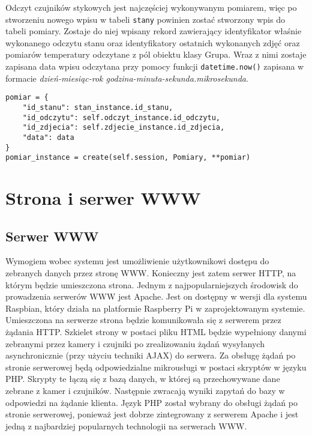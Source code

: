 \documentclass[a4paper,11pt,twoside]{article}
\begin{document}
Odczyt czujników stykowych jest najczęściej wykonywanym pomiarem, więc po stworzeniu nowego wpisu w tabeli \texttt{stany} powinien zostać stworzony wpis do tabeli pomiary. Zostaje do niej wpisany rekord zawierający identyfikator właśnie wykonanego odczytu stanu oraz identyfikatory ostatnich wykonanych zdjęć oraz pomiarów temperatury odczytane z pól obiektu klasy Grupa. Wraz z nimi zostaje zapisana data wpisu odczytana przy pomocy funkcji \texttt{datetime.now()} zapisana w formacie \textit{dzień-miesiąc-rok godzina-minuta-sekunda.mikrosekunda}.
\begin{lstlisting}
pomiar = {
	"id_stanu": stan_instance.id_stanu,
	"id_odczytu": self.odczyt_instance.id_odczytu,
	"id_zdjecia": self.zdjecie_instance.id_zdjecia,
	"data": data
}
pomiar_instance = create(self.session, Pomiary, **pomiar)
\end{lstlisting}

\newpage

\section{Strona i serwer WWW}

\subsection{Serwer WWW}
Wymogiem wobec systemu jest umożliwienie użytkownikowi dostępu do zebranych danych przez stronę WWW. Konieczny jest zatem serwer HTTP, na którym będzie umieszczona strona. Jednym z najpopularniejszych środowisk do prowadzenia serwerów WWW jest Apache. Jest on dostępny w wersji dla systemu Raspbian, który działa na platformie Raspberry Pi w zaprojektowanym systemie. Umieszczona na serwerze strona będzie komunikowała się z serwerem przez żądania HTTP. Szkielet strony w postaci pliku HTML będzie wypełniony danymi zebranymi przez kamery i czujniki po zrealizowaniu żądań wysyłanych asynchronicznie (przy użyciu techniki AJAX) do serwera. Za obsługę żądań po stronie serwerowej będą odpowiedzialne mikrousługi w postaci skryptów w języku PHP. Skrypty te łączą się z bazą danych, w której są przechowywane dane zebrane z kamer i czujników. Następnie zwracają wyniki zapytań do bazy w odpowiedzi na żądanie klienta. Język PHP został wybrany do obsługi żądań po stronie serwerowej, ponieważ jest dobrze zintegrowany z serwerem Apache i jest jedną z najbardziej popularnych technologii na serwerach WWW.
\end{document}
